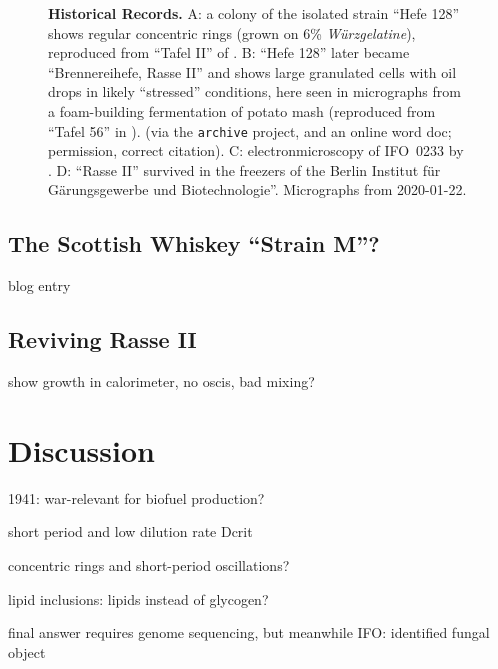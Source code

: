 \documentclass[11pt,a4paper,english]{article}
\newcommand{\ifo}{IFO~0233}
\begin{document}
\begin{figure}[ht]
  \caption{\textbf{Historical Records.}  A: a colony of the isolated
    strain ``Hefe 128'' shows regular concentric rings (grown on 6\%
    \textit{W\"urzgelatine}), reproduced from ``Tafel II'' of
    \citet{Lindner1895}.  B: ``Hefe 128'' later became
    ``Brennereihefe, Rasse II'' and shows large granulated cells with
    oil drops in likely ``stressed'' conditions, here seen in
    micrographs from a foam-building fermentation of potato mash
    (reproduced from ``Tafel 56'' in \citet{Lindner1903}). (via the
    \texttt{archive} project, and an online word doc; permission,
    correct citation). C: electronmicroscopy of \ifo{} by
    \citet{Lloyd2002b}.  D: ``Rasse II'' survived in the freezers of
    the Berlin Institut f\"ur G\"arungsgewerbe und
    Biotechnologie''. Micrographs from 2020-01-22.}
  \label{fig:hefe128}
\end{figure}

\subsection{The Scottish Whiskey ``Strain M''?}

blog entry

\subsection{Reviving Rasse II}

show growth in calorimeter, no oscis, bad mixing?

\section{Discussion}

1941: war-relevant for biofuel production?

short period and low dilution rate Dcrit

concentric rings and short-period oscillations?

lipid inclusions: lipids instead of glycogen?

final answer requires genome sequencing, but meanwhile
IFO: identified fungal object




%
\end{document}
